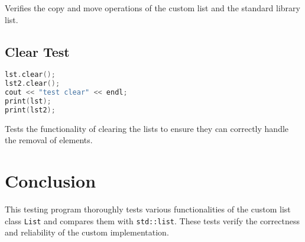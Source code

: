 \documentclass{article}
\begin{document}
Verifies the copy and move operations of the custom list and the standard library list.

\subsection{Clear Test}
\begin{lstlisting}[language=C++]
lst.clear();
lst2.clear();
cout << "test clear" << endl;
print(lst);
print(lst2);
\end{lstlisting}

Tests the functionality of clearing the lists to ensure they can correctly handle the removal of elements.

\section{Conclusion}
This testing program thoroughly tests various functionalities of the custom list class \texttt{List} and compares them with \texttt{std::list}. These tests verify the correctness and reliability of the custom implementation.
\end{document}
